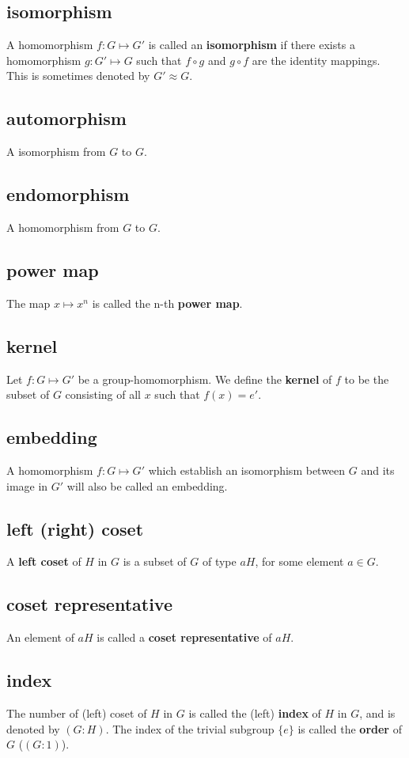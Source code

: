 \documentclass[11pt]{article}
\begin{document}
\subsection{isomorphism}
\label{sec:orgef9434a}
A homomorphism \(f:G\mapsto G'\) is called an \textbf{isomorphism} if there exists a homomorphism
\(g: G'\mapsto G\) such that \(f\circ g\) and \(g\circ f\) are the identity mappings.
This is sometimes denoted by \(G' \approx G\).
\subsection{automorphism}
\label{sec:org9a980ed}
A isomorphism from \(G\) to \(G\).
\subsection{endomorphism}
\label{sec:org85808f8}
A homomorphism from \(G\) to \(G\).
\subsection{power map}
\label{sec:orgd449ad8}
The map \(x\mapsto x^n\) is called the n-th \textbf{power map}.
\subsection{kernel}
\label{sec:orgdbad547}
Let \(f: G\mapsto G'\) be a group-homomorphism.
We define the \textbf{kernel} of \(f\) to be the subset of \(G\) consisting of all \(x\) such that \(f(x) = e'\).
\subsection{embedding}
\label{sec:org801c961}
A homomorphism \(f: G\mapsto G'\) which establish an isomorphism between \(G\) and its image in \(G'\)
will also be called an embedding.
\subsection{left (right) coset}
\label{sec:orgfc1836a}
A \textbf{left coset} of \(H\) in \(G\) is a subset of \(G\) of type \(aH\), for some element \(a\in G\).
\subsection{coset representative}
\label{sec:orga95b1a6}
An element of \(aH\) is called a \textbf{coset representative} of \(aH\).
\subsection{index}
\label{sec:org94de3cd}
The number of (left) coset of \(H\) in \(G\) is called the (left) \textbf{index} of \(H\) in \(G\),
and is denoted by \((G:H)\).
The index of the trivial subgroup \(\{e\}\) is called the \textbf{order} of \(G\) (\((G:1)\)).
\end{document}
